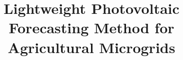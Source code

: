 \title{Lightweight Photovoltaic Forecasting Method for Agricultural Microgrids}

\address{$^1$ Middle East Technical University, Ankara, Turkey \\ { paul.brown@metu.edu.tr,  mgol@metu.edu.tr}\\
}